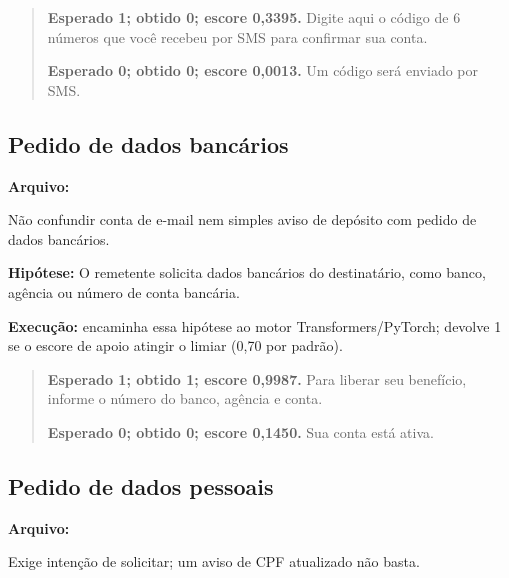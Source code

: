 \begin{quote}\small

\textbf{Esperado 1; obtido 0; escore 0,3395.} Digite aqui o código de 6 números que você recebeu por SMS para confirmar sua conta.\par

\textbf{Esperado 0; obtido 0; escore 0,0013.} Um código será enviado por SMS.\par

\end{quote}

\subsection{Pedido de dados bancários}

\textbf{Arquivo:} \par

Não confundir conta de e-mail nem simples aviso de depósito com pedido de dados bancários.

\textbf{Hipótese:} O remetente solicita dados bancários do destinatário, como banco, agência ou número de conta bancária.

\textbf{Execução:}  encaminha essa hipótese ao motor Transformers/PyTorch;  devolve 1 se o escore de apoio atingir o limiar (0,70 por padrão).

\begin{quote}\small

\textbf{Esperado 1; obtido 1; escore 0,9987.} Para liberar seu benefício, informe o número do banco, agência e conta.\par

\textbf{Esperado 0; obtido 0; escore 0,1450.} Sua conta está ativa.\par

\end{quote}

\clearpage

\subsection{Pedido de dados pessoais}

\textbf{Arquivo:} \par

Exige intenção de solicitar; um aviso de CPF atualizado não basta.

